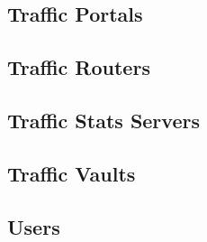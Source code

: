 \subsection{Traffic Portals}

\subsection{Traffic Routers}

\subsection{Traffic Stats Servers}

\subsection{Traffic Vaults}

\subsection{Users\label{sec:users}}

